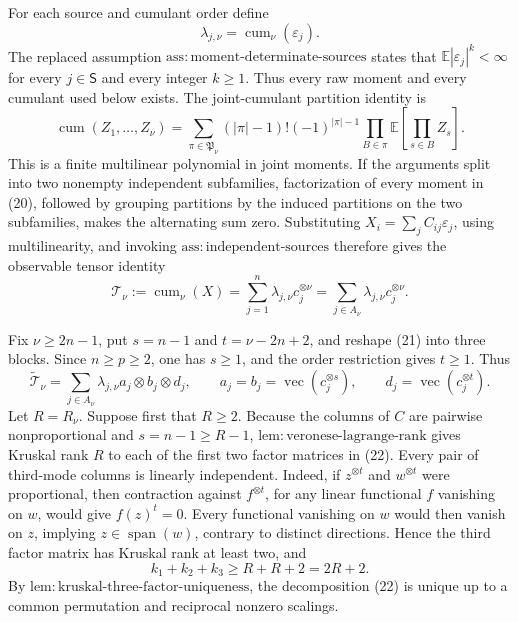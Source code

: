 For each source and cumulant order define
\[
 \lambda_{j,\nu}=\operatorname{cum}_\nu(\varepsilon_j).
\]
The replaced assumption \(\mathrm{ass{:}moment\text{-}determinate\text{-}sources}\) states that \(\mathbb E|\varepsilon_j|^k<\infty\) for every \(j\in\mathsf S\) and every integer \(k\ge1\). Thus every raw moment and every cumulant used below exists. The joint-cumulant partition identity is
\[
 \operatorname{cum}(Z_1,\ldots,Z_\nu)
 =\sum_{\pi\in\mathfrak P_\nu}
 (|\pi|-1)!(-1)^{|\pi|-1}
 \prod_{B\in\pi}\mathbb E\!\left[\prod_{s\in B}Z_s\right]. \tag{20}
\]
This is a finite multilinear polynomial in joint moments. If the arguments split into two nonempty independent subfamilies, factorization of every moment in (20), followed by grouping partitions by the induced partitions on the two subfamilies, makes the alternating sum zero. Substituting \(X_i=\sum_j C_{ij}\varepsilon_j\), using multilinearity, and invoking \(\mathrm{ass{:}independent\text{-}sources}\) therefore gives the observable tensor identity
\[
 \mathcal T_\nu:=\operatorname{cum}_\nu(X)
 =\sum_{j=1}^n\lambda_{j,\nu}c_j^{\otimes\nu}
 =\sum_{j\in A_\nu}\lambda_{j,\nu}c_j^{\otimes\nu}. \tag{21}
\]

Fix \(\nu\ge2n-1\), put \(s=n-1\) and \(t=\nu-2n+2\), and reshape (21) into three blocks. Since \(n\ge p\ge2\), one has \(s\ge1\), and the order restriction gives \(t\ge1\). Thus
\[
 \widetilde{\mathcal T}_\nu
 =\sum_{j\in A_\nu}\lambda_{j,\nu}
 a_j\otimes b_j\otimes d_j,
 \qquad
 a_j=b_j=\operatorname{vec}(c_j^{\otimes s}),
 \qquad
 d_j=\operatorname{vec}(c_j^{\otimes t}). \tag{22}
\]
Let \(R=R_\nu\). Suppose first that \(R\ge2\). Because the columns of \(C\) are pairwise nonproportional and \(s=n-1\ge R-1\), \(\mathrm{lem{:}veronese\text{-}lagrange\text{-}rank}\) gives Kruskal rank \(R\) to each of the first two factor matrices in (22). Every pair of third-mode columns is linearly independent. Indeed, if \(z^{\otimes t}\) and \(w^{\otimes t}\) were proportional, then contraction against \(f^{\otimes t}\), for any linear functional \(f\) vanishing on \(w\), would give \(f(z)^t=0\). Every functional vanishing on \(w\) would then vanish on \(z\), implying \(z\in\operatorname{span}(w)\), contrary to distinct directions. Hence the third factor matrix has Kruskal rank at least two, and
\[
 k_1+k_2+k_3\ge R+R+2=2R+2. \tag{23}
\]
By \(\mathrm{lem{:}kruskal\text{-}three\text{-}factor\text{-}uniqueness}\), the decomposition (22) is unique up to a common permutation and reciprocal nonzero scalings.

